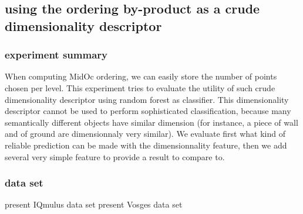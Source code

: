 	\subsection{using the ordering by-product as a crude dimensionality descriptor}
		\subsubsection{experiment summary}
			When computing MidOc ordering, we can easily store the number of points chosen per level.
			This experiment tries to evaluate the utility of such crude dimensionality descriptor using random forest as classifier.
			This dimensionality descriptor cannot be used to perform sophisticated classification, because many semantically different objects have similar dimension (for instance, a piece of wall and of ground are dimensionnaly very similar).
			We evaluate first what kind of reliable prediction can be made with the dimensionnality feature,
			then we add several very simple feature to provide a result to compare to.
			
			
		\subsubsection{data set}
			present IQmulus data set
			present Vosges data set
		\subsubsection{}
		
 